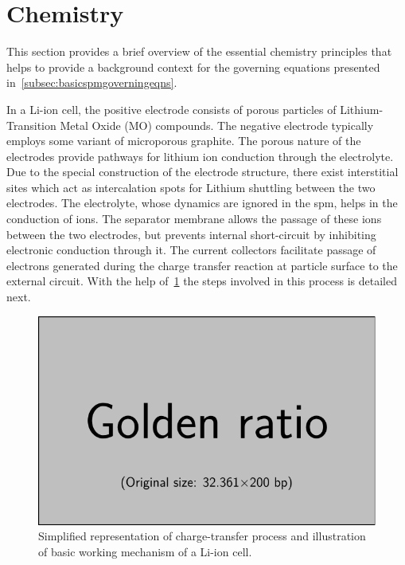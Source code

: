 \section{Chemistry}\label{subsec:liionchemistry}

This section  provides a  brief overview of  the essential  chemistry principles
that helps to provide a background context for the governing equations presented
in~\cref{subsec:basicspmgoverningeqns}.


In  a Li-ion  cell,  the  positive electrode  consists  of  porous particles  of
Lithium-Transition Metal Oxide (MO)  compounds. The negative electrode typically
employs  some  variant  of  microporous  graphite.  The  porous  nature  of  the
electrodes provide pathways for lithium  ion conduction through the electrolyte.
Due  to  the  special  construction  of the  electrode  structure,  there  exist
interstitial  sites  which act  as  intercalation  spots for  Lithium  shuttling
between the two  electrodes. The electrolyte, whose dynamics are  ignored in the
\gls{spm}, helps  in the  conduction of   ions. The  separator membrane
allows  the passage  of  these ions  between the  two  electrodes, but  prevents
internal  short-circuit  by inhibiting  electronic  conduction  through it.  The
current collectors facilitate  passage of electrons generated  during the charge
transfer reaction  at particle surface  to the  external circuit. With  the help
of~\cref{fig:chargetransferprocess}  the  steps  involved  in  this  process  is
detailed next.

\begin{figure}[!htbp]
    \centering
    \includegraphics{placeholder_images/example-image-golden.pdf}
    \caption[Charge-transer and basic working mechanism of a Li-ion cell]{Simplified representation of charge-transfer
    process and illustration of basic working mechanism of a Li-ion cell.}
    \label{fig:chargetransferprocess}
\end{figure}

